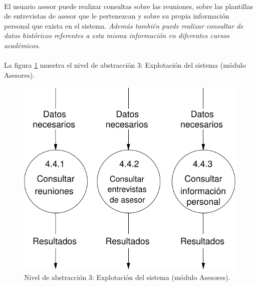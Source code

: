 \paragraph{}El usuario asesor puede realizar consultas sobre las reuniones,
sobre las plantillas de entrevistas de asesor que le pertenezcan y sobre su
propia información personal que exista en el sistema.
\textit{Además también puede realizar consultar de datos históricos referentes a
esta misma información en diferentes cursos académicos}.

\paragraph{}La figura \ref{diagramaNivel3-ExplotacionSistema-asesores}
muestra el nivel de abstracción 3: Explotación del sistema (módulo Asesores).

  \begin{figure}[!ht]
    \begin{center}
      \includegraphics[]{08.Analisis_Funcional/8.2.DFDs/Niveles/Nivel3/Asesores/ExplotacionSistema/Diagramas/nivel3-ExplotacionSistema.pdf}
      \caption{Nivel de abstracción 3: Explotación del sistema (módulo Asesores).}
      \label{diagramaNivel3-ExplotacionSistema-asesores}
    \end{center}
  \end{figure}
